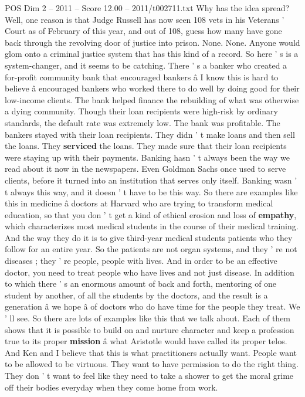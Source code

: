 \begin{textsample}{POS Dim 2 – 2011 – Score 12.00 – 2011/t002711.txt}
Why has the idea spread?
Well, one reason is that Judge Russell has now seen 108 vets in his Veterans ' Court as of February of this year, and out of 108, guess how many have gone back through the revolving door of justice into prison.
None.
None.
Anyone would glom onto a criminal justice system that has this kind of a record.
So here ' s is a system-changer, and it seems to be catching.
There ' s a banker who created a for-profit community bank that encouraged bankers â I know this is hard to believe â encouraged bankers who worked there to do well by doing good for their low-income clients.
The bank helped finance the rebuilding of what was otherwise a dying community.
Though their loan recipients were high-risk by ordinary standards, the default rate was extremely low.
The bank was profitable.
The bankers stayed with their loan recipients.
They didn ' t make loans and then sell the loans.
They \textbf{serviced} the loans.
They made sure that their loan recipients were staying up with their payments.
Banking hasn ' t always been the way we read about it now in the newspapers.
Even Goldman Sachs once used to serve clients, before it turned into an institution that serves only itself.
Banking wasn ' t always this way, and it doesn ' t have to be this way.
So there are examples like this in medicine â doctors at Harvard who are trying to transform medical education, so that you don ' t get a kind of ethical erosion and loss of \textbf{empathy}, which characterizes most medical students in the course of their medical training.
And the way they do it is to give third-year medical students patients who they follow for an entire year.
So the patients are not organ systems, and they ' re not diseases ; they ' re people, people with lives.
And in order to be an effective doctor, you need to treat people who have lives and not just disease.
In addition to which there ' s an enormous amount of back and forth, mentoring of one student by another, of all the students by the doctors, and the result is a generation â we hope â of doctors who do have time for the people they treat.
We ' ll see.
So there are lots of examples like this that we talk about.
Each of them shows that it is possible to build on and nurture character and keep a profession true to its proper \textbf{mission} â what Aristotle would have called its proper telos.
And Ken and I believe that this is what practitioners actually want.
People want to be allowed to be virtuous.
They want to have permission to do the right thing.
They don ' t want to feel like they need to take a shower to get the moral grime off their bodies everyday when they come home from work.

\end{textsample}
